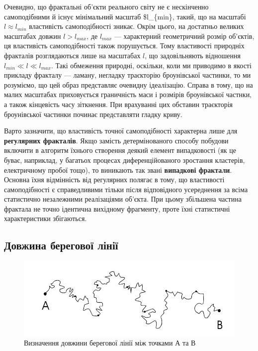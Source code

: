 \documentclass[
  letterpaper,
]{report}
\begin{document}
Очевидно, що фрактальні об'єкти реального світу не є нескінченно
самоподібними й існує мінімальний масштаб \$l\_\{min\}, такий, що на
масштабі \(l \approx l_{min}\) властивість самоподібності зникає. Окрім
цього, на достатньо великих масштабах довжин \(l > l_{max}\), де
\(l_{max}\) --- характерний геометричний розмір об'єктів, ця властивість
самоподібності також порушується. Тому властивості природніх фракталів
розглядаються лише на масштабах \(l\), що задовільняють відношення
\(l_{min} \ll l \ll l_{max}\). Такі обмеження природні, оскільки, коли
ми приводимо в якості прикладу фракталу --- ламану, негладку траєкторію
броунівської частинки, то ми розуміємо, що цей образ представляє
очевидну ідеалізацію. Справа в тому, що на малих масштабах приховується
граничність маси і розмірів броунівської частнки, а також кінцевість
часу зіткнення. При врахуванні цих обставин траєкторія броунівської
частинки починає представляти гладку криву.

Варто зазначити, що властивість точної самоподібності характерна лише
для \textbf{регулярних фракталів}. Якщо замість детермінованого способу
побудови включити в алгоритм їхнього створення деякий елемент
випадковості (як це буває, наприклад, у багатьох процесах
диференційованого зростання кластерів, електричному пробої тощо), то
виникають так звані \textbf{випадкові фрактали}. Основна їхня
відмінність від регулярних полягає в тому, що властивості самоподібності
є справедливими тільки після відповідного усереднення за всіма
статистично незалежними реалізаціями об'єкта. При цьому збільшена
частина фрактала не точно ідентична вихідному фрагменту, проте їхні
статистичні характеристики збігаються.

\hypertarget{ux434ux43eux432ux436ux438ux43dux430-ux431ux435ux440ux435ux433ux43eux432ux43eux457-ux43bux456ux43dux456ux457}{%
\subsection{Довжина берегової
лінії}\label{ux434ux43eux432ux436ux438ux43dux430-ux431ux435ux440ux435ux433ux43eux432ux43eux457-ux43bux456ux43dux456ux457}}

\begin{figure}

{\centering 

\includegraphics{Images/lab_6/costline.jpg}

}

\caption{\label{fig-costline}Визначення довжини берегової лінії між
точками А та В}

\end{figure}
\end{document}
